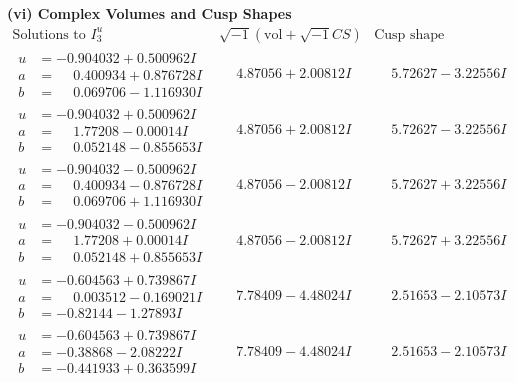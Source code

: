 \documentclass[1p]{elsarticle_modified}
\theoremstyle{definition}
\newcommand{\I}{\sqrt{-1}}
\begin{document}
\newpage\flushleft \textbf{(vi) Complex Volumes and Cusp Shapes}
$$\begin{array}{c|c|c}  
\text{Solutions to }I^u_{3}& \I (\text{vol} + \sqrt{-1}CS) & \text{Cusp shape}\\
 \hline 
\begin{aligned}
u &= -0.904032 + 0.500962 I \\
a &= \phantom{-}0.400934 + 0.876728 I \\
b &= \phantom{-}0.069706 - 1.116930 I\end{aligned}
 & \phantom{-}4.87056 + 2.00812 I & \phantom{-}5.72627 - 3.22556 I \\ \hline\begin{aligned}
u &= -0.904032 + 0.500962 I \\
a &= \phantom{-}1.77208 - 0.00014 I \\
b &= \phantom{-}0.052148 - 0.855653 I\end{aligned}
 & \phantom{-}4.87056 + 2.00812 I & \phantom{-}5.72627 - 3.22556 I \\ \hline\begin{aligned}
u &= -0.904032 - 0.500962 I \\
a &= \phantom{-}0.400934 - 0.876728 I \\
b &= \phantom{-}0.069706 + 1.116930 I\end{aligned}
 & \phantom{-}4.87056 - 2.00812 I & \phantom{-}5.72627 + 3.22556 I \\ \hline\begin{aligned}
u &= -0.904032 - 0.500962 I \\
a &= \phantom{-}1.77208 + 0.00014 I \\
b &= \phantom{-}0.052148 + 0.855653 I\end{aligned}
 & \phantom{-}4.87056 - 2.00812 I & \phantom{-}5.72627 + 3.22556 I \\ \hline\begin{aligned}
u &= -0.604563 + 0.739867 I \\
a &= \phantom{-}0.003512 - 0.169021 I \\
b &= -0.82144 - 1.27893 I\end{aligned}
 & \phantom{-}7.78409 - 4.48024 I & \phantom{-}2.51653 - 2.10573 I \\ \hline\begin{aligned}
u &= -0.604563 + 0.739867 I \\
a &= -0.38868 - 2.08222 I \\
b &= -0.441933 + 0.363599 I\end{aligned}
 & \phantom{-}7.78409 - 4.48024 I & \phantom{-}2.51653 - 2.10573 I \\ \hline\begin{aligned}

\end{aligned}
\end{array}$$
\end{document}
